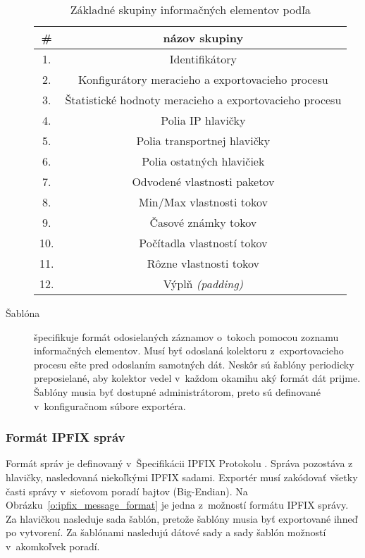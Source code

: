 \begin{description}
\tabcolsep=8pt
\begin{table}[!ht]\caption{Základné skupiny informačných elementov podľa \citep{rfc5102}}\label{t:ie-table}
\smallskip
\centering
\begin{tabular}{|c|c|}
\hline
\textbf{\#} & \textbf{názov skupiny} \\ \hline
1. & Identifikátory \\ \hline
2. & Konfigurátory meracieho a exportovacieho procesu \\ \hline
3. & Štatistické hodnoty meracieho a exportovacieho procesu \\ \hline
4. & Polia IP hlavičky \\ \hline
5. & Polia transportnej hlavičky \\ \hline
6. & Polia ostatných hlavičiek \\ \hline
7. & Odvodené vlastnosti paketov \\ \hline
8. & Min/Max vlastnosti tokov \\ \hline
9. & Časové známky tokov \\ \hline
10. & Počítadla vlastností tokov \\ \hline
11. & Rôzne vlastnosti tokov \\ \hline
12. & Výplň \emph{(padding)} \\ \hline
\end{tabular}
\end{table}


\clearpage
  \item[Šablóna] špecifikuje formát odosielaných záznamov o~tokoch pomocou zoznamu 
informačných elementov. Musí byť odoslaná kolektoru 
z~exportovacieho procesu ešte pred odoslaním samotných dát. Neskôr sú šablóny periodicky 
preposielané, aby kolektor vedel v~každom okamihu aký formát dát prijme. 
Šablóny musia byť dostupné administrátorom, preto sú definované v~konfiguračnom súbore 
exportéra.
\citep{juvhaugen}
\end{description}



\subsubsection{Formát IPFIX správ} \label{sec:message_format}

Formát správ je definovaný v~Špecifikácii IPFIX Protokolu \citep{rfc5101}. Správa pozostáva z~
hlavičky, nasledovaná niekoľkými IPFIX sadami. 
Exportér musí zakódovať všetky časti správy v~sieťovom poradí bajtov (Big-Endian).
Na Obrázku~\ref{o:ipfix_message_format} je jedna z~možností formátu IPFIX správy. Za hlavičkou nasleduje sada šablón, pretože
šablóny musia byť exportované ihneď po vytvorení. Za šablónami nasledujú dátové sady a sady šablón možností 
v~akomkoľvek poradí.

